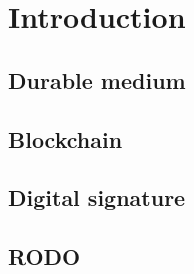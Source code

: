 \newpage
\section{Introduction}
\subsection{Durable medium}
\subsection{Blockchain}
\subsection{Digital signature}
\subsection{RODO}